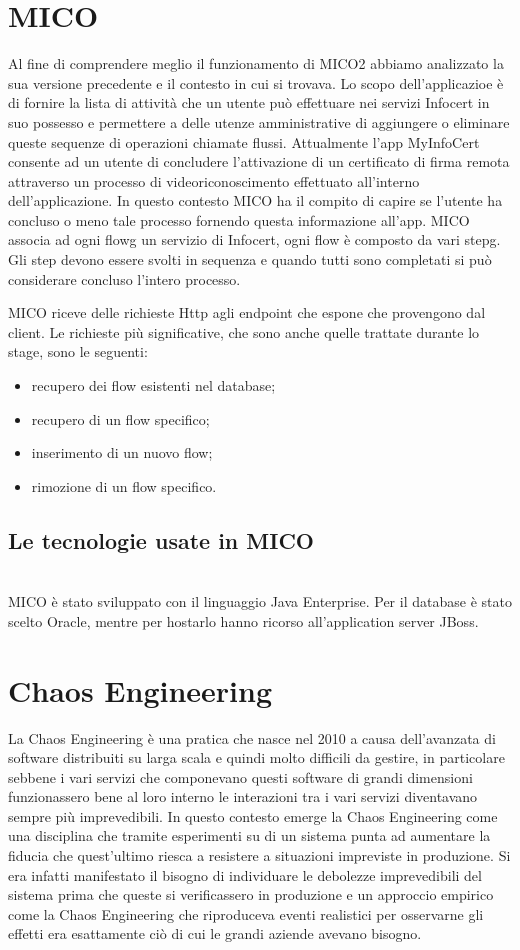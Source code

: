 \section{MICO}
Al fine di comprendere meglio il funzionamento di MICO2 abbiamo analizzato la sua versione precedente e il contesto in cui si trovava.
Lo scopo dell'applicazioe è di fornire la lista di attività che un utente può effettuare nei servizi Infocert in suo possesso e permettere a delle utenze amministrative di aggiungere o eliminare queste sequenze di operazioni chiamate flussi.
Attualmente l'app MyInfoCert consente ad un utente di concludere l'attivazione di un certificato di firma remota attraverso un processo di videoriconoscimento effettuato all'interno dell'applicazione. 
In questo contesto MICO ha il compito di capire se l'utente ha concluso o meno tale processo fornendo questa informazione all'app.
MICO associa ad ogni \gls{flowg} un servizio di Infocert, ogni flow è composto da vari \gls{stepg}.
Gli step devono essere svolti in sequenza e quando tutti sono completati si può considerare concluso l'intero processo.

MICO riceve delle richieste Http agli endpoint che espone che provengono dal client.
Le richieste più significative, che sono anche quelle trattate durante lo stage, sono le seguenti:
\begin{itemize}
    \item recupero dei flow esistenti nel database;
    \item recupero di un flow specifico;
    \item inserimento di un nuovo flow;
    \item rimozione di un flow specifico.
\end{itemize}

\subsection{Le tecnologie usate in MICO}\mbox{}\\
MICO è stato sviluppato con il linguaggio Java Enterprise. Per il database è stato scelto Oracle, mentre per hostarlo hanno ricorso all'application server JBoss.

\section{Chaos Engineering}
La Chaos Engineering è una pratica che nasce nel 2010 a causa dell'avanzata di software distribuiti su larga scala e quindi molto difficili da gestire, in particolare sebbene i vari servizi che componevano questi software di grandi dimensioni funzionassero bene al loro interno le interazioni tra i vari servizi diventavano sempre più imprevedibili.
In questo contesto emerge la Chaos Engineering come una disciplina che tramite esperimenti su di un sistema punta ad aumentare la fiducia che quest'ultimo riesca a resistere a situazioni impreviste in produzione.
Si era infatti manifestato il bisogno di individuare le debolezze imprevedibili del sistema prima che queste si verificassero in produzione e un approccio empirico come la Chaos Engineering che riproduceva eventi realistici per osservarne gli effetti era esattamente ciò di cui le grandi aziende avevano bisogno.

